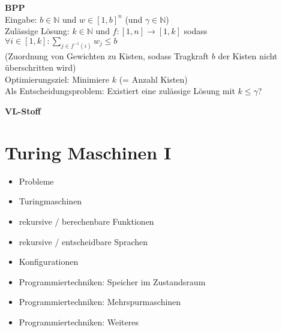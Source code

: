 \documentclass[a4paper,graphics,11pt]{article}
\begin{document}
\strut

\textbf{BPP}
\\[10pt]
Eingabe: $b \in \mathbb{N}$ und $w \in [1,b]^n$ (und $\gamma \in \mathbb{N}$)
\\[10pt]
Zulässige Lösung: $k \in \mathbb{N}$ und $f : [1,n] \to [1,k]$ sodass
$\displaystyle\forall i \in [1,k]: \sum_{j \in f^{-1}(i)} w_j \leq b$\\
(Zuordnung von Gewichten zu Kisten, sodass Tragkraft $b$ der Kisten nicht überschritten wird)
\\[10pt]
Optimierungsziel: Minimiere $k$ (= Anzahl Kisten)
\\[10pt]
Als Entscheidungsproblem: Existiert eine zulässige Lösung mit $k \leq \gamma$?


\newpage

\begin{center}
    \LARGE \textbf{VL-Stoff}
\end{center}

\section{Turing Maschinen I}

\begin{itemize}
    \item Probleme
    \item Turingmaschinen
    \item rekursive / berechenbare Funktionen
    \item rekursive / entscheidbare Sprachen
    \item Konfigurationen
    \item Programmiertechniken: Speicher im Zustandsraum
    \item Programmiertechniken: Mehrspurmaschinen
    \item Programmiertechniken: Weiteres
\end{itemize}
\end{document}
